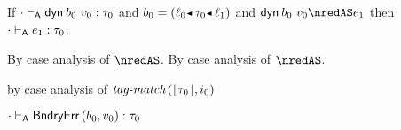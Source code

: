 \begin{lemma}\label{A-dyn-type-preservation}\leavevmode
  If\/ $\snil \sWTA \edynb{\sbnd_0}{\svalue_0} : \stype_0$
  and\/ $\sbnd_0 \eeq \obnd{\sowner_0}{\stype_0}{\sowner_1}$
  and\/ $\edynb{\sbnd_0}{\svalue_0} \nredAS \sexpr_1$
  then\/ $\snil \sWTA \sexpr_1 : \stype_0$.
\end{lemma}{
  \newcommand{\shortproof}{By case analysis of $\nredAS$.}
\begin{lamportproof*}
  \shortproof
\mainproof
  \shortproof

    \begin{pfproof}
      \qedstep
        \begin{pfproof}
          \begin{mathpar}
          \end{mathpar}
        \end{pfproof}
    \end{pfproof}

    \begin{pfproof}
      \qedstep
        \begin{pfproof}
          by case analysis of $\fshallow{\tagof{\stype_0}}{\sint_0}$
        \end{pfproof}
    \end{pfproof}

    \begin{pfproof}
      \qedstep
        \begin{pfproof}
          $\snil \sWTA \boundaryerror{\sbnd_0}{\svalue_0} : \stype_0$
        \end{pfproof}
    \end{pfproof}

\end{lamportproof*}}

